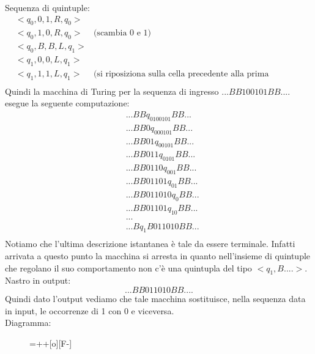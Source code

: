 \begin{itemize}
Sequenza di quintuple:
\begin{eqnarray*}
&<q_0,0,1,R,q_0>&\\
&<q_0,1,0,R,q_0>&\mbox{(scambia 0 e 1)}\\
&<q_0,B,B,L,q_1>&\\
&<q_1,0,0,L,q_1>&\\
&<q_1,1,1,L,q_1>&\mbox{(si riposiziona sulla cella precedente alla prima significativa)}\\
\end{eqnarray*}
Quindi la macchina di Turing per la sequenza di ingresso $...BB100101BB....$ esegue la seguente computazione:
\begin{eqnarray*}
&...BBq_0100101BB...\\
&...BB0q_000101BB...\\
&...BB01q_00101BB...\\
&...BB011q_0101BB...\\
&...BB0110q_001BB...\\
&...BB01101q_01BB...\\
&...BB011010q_0BB...\\
&...BB01101q_10BB...\\
&...\\
&...Bq_1B011010BB...\\
\end{eqnarray*}
Notiamo che l'ultima descrizione istantanea \`e tale da essere
terminale. Infatti arrivata a questo punto la macchina si arresta in
quanto nell'insieme di quintuple che regolano il suo comportamento non
c'\`e una quintupla del tipo $<q_1,B....>$.\\
\vspace{0.3 cm} Nastro in output:$$...BB011010BB....$$ Quindi dato
l'output vediamo che tale macchina sostituisce, nella sequenza data in
input, le occorrenze di 1 con 0 e viceversa.\\
\vspace{0.2cm}
Diagramma:
\begin{figure}[hbtp!]
\hspace{3 cm} \entrymodifiers={++[o][F-]} 
\end{figure}


\end{itemize}

